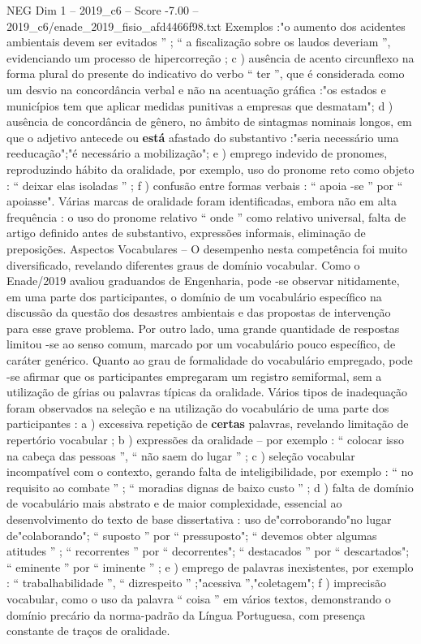 \begin{textsample}{NEG Dim 1 – 2019\_c6 – Score -7.00 – 2019\_c6/enade\_2019\_fisio\_afd4466f98.txt}
Exemplos :"o aumento dos acidentes ambientais devem ser evitados ” ; “ a fiscalização sobre os laudos deveriam ”, evidenciando um processo de hipercorreção ; c ) ausência de acento circunflexo na forma plural do presente do indicativo do verbo “ ter ”, que é considerada como um desvio na concordância verbal e não na acentuação gráfica :"os estados e municípios tem que aplicar medidas punitivas a empresas que desmatam"; d ) ausência de concordância de gênero, no âmbito de sintagmas nominais longos, em que o adjetivo antecede ou \textbf{está} afastado do substantivo :"seria necessário uma reeducação";"é necessário a mobilização"; e ) emprego indevido de pronomes, reproduzindo hábito da oralidade, por exemplo, uso do pronome reto como objeto : “ deixar elas isoladas ” ; f ) confusão entre formas verbais : “ apoia -se ” por “ apoiasse".
Várias marcas de oralidade foram identificadas, embora não em alta frequência : o uso do pronome relativo “ onde ” como relativo universal, falta de artigo definido antes de substantivo, expressões informais, eliminação de preposições.
Aspectos Vocabulares – O desempenho nesta competência foi muito diversificado, revelando diferentes graus de domínio vocabular.
Como o Enade/2019 avaliou graduandos de Engenharia, pode -se observar nitidamente, em uma parte dos participantes, o domínio de um vocabulário específico na discussão da questão dos desastres ambientais e das propostas de intervenção para esse grave problema.
Por outro lado, uma grande quantidade de respostas limitou -se ao senso comum, marcado por um vocabulário pouco específico, de caráter genérico.
Quanto ao grau de formalidade do vocabulário empregado, pode -se afirmar que os participantes empregaram um registro semiformal, sem a utilização de gírias ou palavras típicas da oralidade.
Vários tipos de inadequação foram observados na seleção e na utilização do vocabulário de uma parte dos participantes : a ) excessiva repetição de \textbf{certas} palavras, revelando limitação de repertório vocabular ; b ) expressões da oralidade – por exemplo : “ colocar isso na cabeça das pessoas ”, “ não saem do lugar ” ; c ) seleção vocabular incompatível com o contexto, gerando falta de inteligibilidade, por exemplo : “ no requisito ao combate ” ; “ moradias dignas de baixo custo ” ; d ) falta de domínio de vocabulário mais abstrato e de maior complexidade, essencial ao desenvolvimento do texto de base dissertativa : uso de"corroborando"no lugar de"colaborando"; “ suposto ” por “ pressuposto"; “ devemos obter algumas atitudes ” ; “ recorrentes ” por “ decorrentes"; “ destacados ” por “ descartados"; “ eminente ” por “ iminente ” ; e ) emprego de palavras inexistentes, por exemplo : “ trabalhabilidade ”, “ dizrespeito ” ;"acessiva ”,"coletagem"; f ) imprecisão vocabular, como o uso da palavra “ coisa ” em vários textos, demonstrando o domínio precário da norma-padrão da Língua Portuguesa, com presença constante de traços de oralidade.

\end{textsample}
